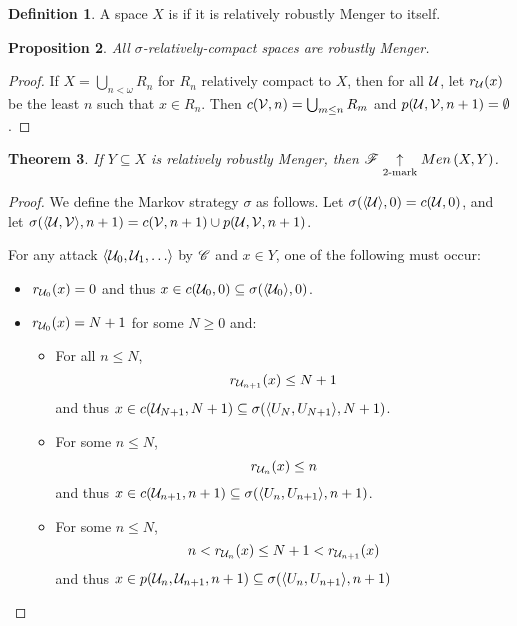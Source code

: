 \documentclass{amsart}
\newtheorem{theorem}{Theorem}[section]
\newtheorem{proposition}[theorem]{Proposition}
\theoremstyle{definition}
\newtheorem{definition}[theorem]{Definition}
\begin{document}
\begin{definition}
  A space \(X\) is  if it is relatively robustly
  Menger to itself.
\end{definition}

\begin{proposition}
  All \(\sigma\)-relatively-compact spaces are robustly Menger.
\end{proposition}

\begin{proof}
  If \(X=\bigcup_{n<\omega}R_n\) for \(R_n\) relatively compact to \(X\),
  then for all \(\mathcal{U}\), let \(r_{\mathcal{U}}(x)\) be the
  least \(n\) such that \(x\in R_n\). Then \(c(\mathcal{V},n)=\bigcup_{m\leq n}R_m\) and
  \(p(\mathcal{U},\mathcal{V},n+1) = \emptyset\).
\end{proof}

\begin{theorem}
  If \(Y\subseteq X\) is relatively robustly Menger, then
  \(\mathscr{F}\underset{2\text{-mark}}{\uparrow}Men\left({X,Y}\right)\).
\end{theorem}

\begin{proof}
  We define the Markov strategy \(\sigma\) as follows.
  Let \(\sigma(\langle\mathcal{U}\rangle,0)=c(\mathcal{U},0)\), and let
  \(\sigma(\langle\mathcal{U},\mathcal{V}\rangle,n+1)=c(\mathcal{V},n+1)\cup p(\mathcal{U}, \mathcal{V},n+1)\).

  For any attack \(\<\mc{U}_0,\mc{U}_1,\dots\>\) by \(\mathscr{C}\) and \(x\in Y\),
  one of the following must occur:

  \begin{itemize}
    \item
      \(r_{\mathcal{U}_0}(x)=0\) and thus
      \(x\in c(\mathcal{U}_0,0)\subseteq \sigma(\langle\mathcal{U}_0\rangle,0)\).

    \item
      \(r_{\mathcal{U}_0}(x)=N+1\) for some \(N\geq 0\) and:
      \begin{itemize}
        \item
          For all \(n\leq N\),
          \[
            r_{\mathcal{U}_{n+1}}(x)\leq N+1
          \]
          and thus
          \(x\in c(\mathcal{U}_{N+1},N+1) \subseteq
            \sigma(\langle U_N,U_{N+1}\rangle,N+1)\).
        \item
          For some \(n \leq N\),
          \[ r_{\mathcal{U}_n}(x)\leq n \]
          and thus
          \(x\in c(\mathcal{U}_{n+1},n+1) \subseteq
            \sigma(\langle U_n,U_{n+1}\rangle,n+1)\).
        \item
          For some \(n \leq N\),
          \[
            n < r_{\mathcal{U}_n}(x)\leq N+1 < r_{\mathcal{U}_{n+1}}(x)
          \]
         and thus
         \(x\in p(\mathcal{U}_n,\mathcal{U}_{n+1},n+1) \subseteq
          \sigma(\langle U_n,U_{n+1}\rangle,n+1)\)
       \end{itemize}
  \end{itemize}
\end{proof}
\end{document}
